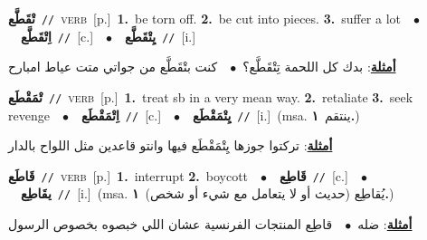 \documentclass[10pt,a4paper,twoside]{article} %
\begin{document}
\begin{multicols}{2}
{\setlength\topsep{0pt}\textbf{\foreignlanguage{arabic}{تْقَطَّع}}\ {\color{gray}\texttt{//}\color{black}}\ \textsc{verb}\ [p.]\ \textbf{1.}~be torn off.  \textbf{2.}~be cut into pieces.  \textbf{3.}~suffer a lot\ \ $\bullet$\ \ \setlength\topsep{0pt}\textbf{\foreignlanguage{arabic}{اِتْقَطَّع}}\ {\color{gray}\texttt{//}\color{black}}\ [c.]\ \ $\bullet$\ \ \setlength\topsep{0pt}\textbf{\foreignlanguage{arabic}{يِتْقَطَّع}}\ {\color{gray}\texttt{//}\color{black}}\ [i.]\  \begin{flushright}\color{gray}\foreignlanguage{arabic}{\textbf{\underline{\foreignlanguage{arabic}{أمثلة}}}: بدك كل اللحمة تِتْقَطَّع؟\ $\bullet$\ \  كنت بتْقَطَّع من جواتي متت عياط امبارح}\end{flushright}\color{black}} \vspace{2mm}

{\setlength\topsep{0pt}\textbf{\foreignlanguage{arabic}{تْمَقْطَع}}\ {\color{gray}\texttt{//}\color{black}}\ \textsc{verb}\ [p.]\ \textbf{1.}~treat sb in a very mean way.  \textbf{2.}~retaliate  \textbf{3.}~seek revenge\ \ $\bullet$\ \ \setlength\topsep{0pt}\textbf{\foreignlanguage{arabic}{اِتْمَقْطَع}}\ {\color{gray}\texttt{//}\color{black}}\ [c.]\ \ $\bullet$\ \ \setlength\topsep{0pt}\textbf{\foreignlanguage{arabic}{يِتْمَقْطَع}}\ {\color{gray}\texttt{//}\color{black}}\ [i.]\ \color{gray}(msa. \foreignlanguage{arabic}{ينتقم}~\foreignlanguage{arabic}{\textbf{١.}})\color{black}\  \begin{flushright}\color{gray}\foreignlanguage{arabic}{\textbf{\underline{\foreignlanguage{arabic}{أمثلة}}}: تركتوا جوزها يِتْمَقْطَع فيها وانتو قاعدين مثل اللواح بالدار}\end{flushright}\color{black}} \vspace{2mm}

{\setlength\topsep{0pt}\textbf{\foreignlanguage{arabic}{قَاطَع}}\ {\color{gray}\texttt{//}\color{black}}\ \textsc{verb}\ [p.]\ \textbf{1.}~interrupt  \textbf{2.}~boycott\ \ $\bullet$\ \ \setlength\topsep{0pt}\textbf{\foreignlanguage{arabic}{قَاطِع}}\ {\color{gray}\texttt{//}\color{black}}\ [c.]\ \ $\bullet$\ \ \setlength\topsep{0pt}\textbf{\foreignlanguage{arabic}{يقَاطِع}}\ {\color{gray}\texttt{//}\color{black}}\ [i.]\ \color{gray}(msa. \foreignlanguage{arabic}{يُقاطِع (حديث أو لا يتعامل مع شيء أو شخص)}~\foreignlanguage{arabic}{\textbf{١.}})\color{black}\  \begin{flushright}\color{gray}\foreignlanguage{arabic}{\textbf{\underline{\foreignlanguage{arabic}{أمثلة}}}: ضله\ $\bullet$\ \  قاطِع المنتجات الفرنسية عشان اللي خبصوه بخصوص الرسول}\end{flushright}\color{black}} \vspace{2mm}


\end{multicols}
\end{document}
